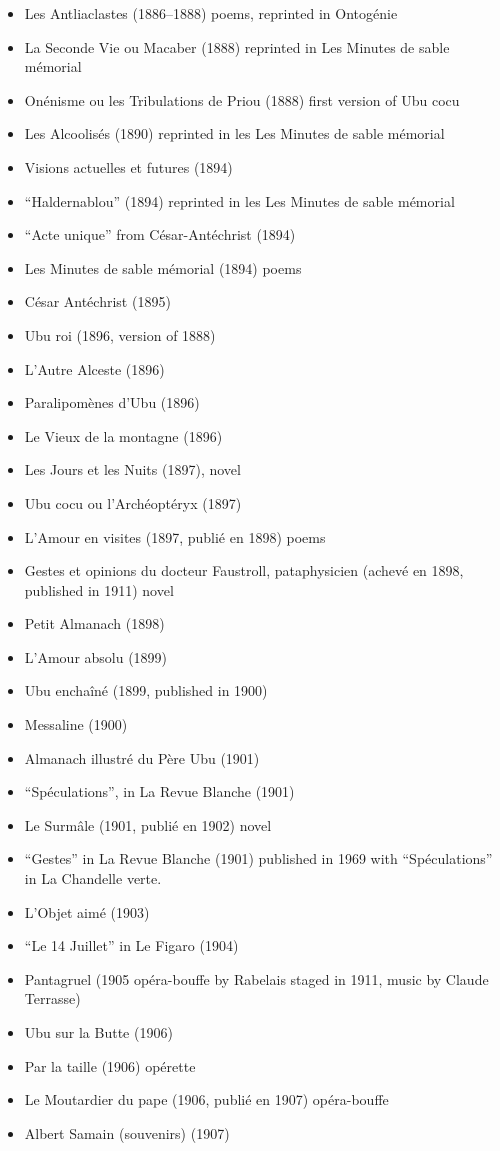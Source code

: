 \begin{itemize}
  \item Les Antliaclastes (1886--1888) poems, reprinted in Ontogénie
  \item La Seconde Vie ou Macaber (1888) reprinted in Les Minutes de sable mémorial
  \item Onénisme ou les Tribulations de Priou (1888) first version of Ubu cocu
  \item Les Alcoolisés (1890) reprinted in les Les Minutes de sable mémorial
  \item Visions actuelles et futures (1894)
  \item ``Haldernablou'' (1894) reprinted in les Les Minutes de sable mémorial
  \item ``Acte unique'' from César-Antéchrist (1894)
  \item Les Minutes de sable mémorial (1894) poems
  \item César Antéchrist (1895)
  \item Ubu roi (1896, version of 1888)
  \item L’Autre Alceste (1896)
  \item Paralipomènes d’Ubu (1896)
  \item Le Vieux de la montagne (1896)
  \item Les Jours et les Nuits (1897), novel
  \item Ubu cocu ou l'Archéoptéryx (1897)
  \item L’Amour en visites (1897, publié en 1898) poems
  \item Gestes et opinions du docteur Faustroll, pataphysicien (achevé en 1898, published in 1911) novel
  \item Petit Almanach (1898)
  \item L’Amour absolu (1899)
  \item Ubu enchaîné (1899, published in 1900)
  \item Messaline (1900)
  \item Almanach illustré du Père Ubu (1901)
  \item ``Spéculations'', in La Revue Blanche (1901)
  \item Le Surmâle (1901, publié en 1902) novel
  \item ``Gestes'' in La Revue Blanche (1901) published in 1969 with ``Spéculations'' in  La Chandelle verte.
  \item L’Objet aimé (1903)
  \item ``Le 14 Juillet'' in Le Figaro (1904)
  \item Pantagruel (1905 opéra-bouffe by Rabelais staged in 1911, music by Claude Terrasse)
  \item Ubu sur la Butte (1906)
  \item Par la taille (1906) opérette
  \item Le Moutardier du pape (1906, publié en 1907) opéra-bouffe
  \item Albert Samain (souvenirs) (1907)
\end{itemize}

